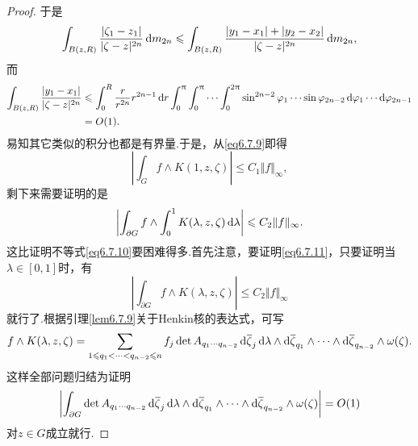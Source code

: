 \begin{proof}
	于是
	\[\int_{B(z,R)}\frac{|\zeta_1-z_1|}{|\zeta-z|^{2n}}\mathop{}\!\mathrm{d} m_{2n}\leqslant\int_{B(z,R)}\frac{|y_1-x_1|+|y_2-x_2|}{|\zeta-z|^{2n}}\mathop{}\!\mathrm{d} m_{2n},\]
	而
	\begin{align*}
    \int_{B(z,R)}\frac{|y_1-x_1|}{|\zeta-z|^{2n}}
    &\leqslant\int_{0}^{R}\frac{r}{r^{2n}}r^{2n-1}\mathop{}\!\mathrm{d} r\int_{0}^{\uppi}\int_{0}^{\uppi}\cdots\int_{0}^{2\uppi}\sin^{2n-2}\varphi_1\cdots\sin\varphi_{2n-2}\mathop{}\!\mathrm{d}\varphi_1\cdots\mathop{}\!\mathrm{d}\varphi_{2n-1}\\
    &=O(1).		
	\end{align*}
	易知其它类似的积分也都是有界量.于是，从\eqref{eq6.7.9}即得
	\begin{equation}\label{eq6.7.10}
		\left|\int_G f\wedge K(1,z,\zeta)\right|\le C_1\Vert f\Vert_\infty,
	\end{equation}
	剩下来需要证明的是
	\begin{equation}\label{eq6.7.11}
		\left|\int_{\partial G}f\wedge\int_{0}^{1}K(\lambda,z,\zeta)\mathop{}\!\mathrm{d}\lambda\right|\leqslant C_2\Vert f\Vert_\infty.
	\end{equation}
	这比证明不等式\eqref{eq6.7.10}要困难得多.首先注意，要证明\eqref{eq6.7.11}，只要证明当$\lambda\in[0,1]$时，有
	\[\left|\int_{\partial G}f\wedge K(\lambda,z,\zeta)\right|\le C_2\Vert f\Vert_\infty\]
	就行了.根据引理\ref{lem6.7.9}关于Henkin核的表达式，可写
	\[f\wedge K(\lambda,z,\zeta)=\sum_{1\leqslant q_1<\cdots<q_{n-2}\leqslant n}f_j\det A_{q_1\cdots q_{n-2}}\mathop{}\!\mathrm{d}{}\mkern1mu\overline{\mkern-1mu\zeta}_j\mathop{}\!\mathrm{d}\lambda\wedge\mathop{}\!\mathrm{d}{}\mkern1mu\overline{\mkern-1mu\zeta}_{q_1}\wedge\cdots\wedge\mathop{}\!\mathrm{d}{}\mkern1mu\overline{\mkern-1mu\zeta}_{q_{n-2}}\wedge\omega(\zeta).\]
	这样全部问题归结为证明
	\begin{equation}\label{eq6.7.12}
		\left|\int_{\partial G}\det A_{q_1\cdots q_{n-2}}\mathop{}\!\mathrm{d}{}\mkern1mu\overline{\mkern-1mu\zeta}_j\mathop{}\!\mathrm{d}\lambda\wedge\mathop{}\!\mathrm{d}{}\mkern1mu\overline{\mkern-1mu\zeta}_{q_1}\wedge\cdots\wedge\mathop{}\!\mathrm{d}{}\mkern1mu\overline{\mkern-1mu\zeta}_{q_{n-2}}\wedge\omega(\zeta)\right|=O(1)
	\end{equation}
	对$z\in G$成立就行.
	

\end{proof}
